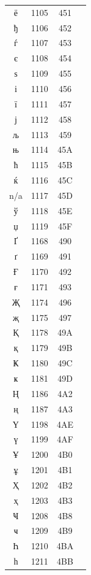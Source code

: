 ﻿\documentclass[10pt]{article}
\begin{document}
\begin{tabular}{crcl}
ё&1105&451&\\
ђ&1106&452&\\
ѓ&1107&453&\\
є&1108&454&\\
ѕ&1109&455&\\
і&1110&456&\\
ї&1111&457&\\
ј&1112&458&\\
љ&1113&459&\\
њ&1114&45A&\\
ћ&1115&45B&\\
ќ&1116&45C&\\
n/a&1117&45D&\\
ў&1118&45E&\\
џ&1119&45F&\\
Ґ&1168&490&\\
ґ&1169&491&\\
Ғ&1170&492&\\
ғ&1171&493&\\
Җ&1174&496&\\
җ&1175&497&\\
Қ&1178&49A&\\
қ&1179&49B&\\
Ҝ&1180&49C&\\
ҝ&1181&49D&\\
Ң&1186&4A2&\\
ң&1187&4A3&\\
Ү&1198&4AE&\\
ү&1199&4AF&\\
Ұ&1200&4B0&\\
ұ&1201&4B1&\\
Ҳ&1202&4B2&\\
ҳ&1203&4B3&\\
Ҹ&1208&4B8&\\
ҹ&1209&4B9&\\
Һ&1210&4BA&\\
һ&1211&4BB&\\
\end{tabular}
\end{document}
